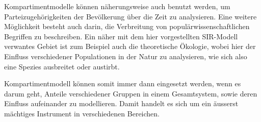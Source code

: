 \begin{refsection}
Kompartimentmodelle können näherungsweise auch benutzt werden, um Parteizugehörigkeiten der Bevölkerung über die Zeit zu analysieren. 
Eine weitere Möglichkeit besteht auch darin, die Verbreitung von populärwissenschaftlichen Begriffen zu beschreiben. 
Ein näher mit dem hier vorgestellten SIR-Modell verwantes Gebiet ist zum Beispiel auch die theoretische Ökologie, wobei hier der Einfluss verschiedener Populationen in der Natur zu analysieren, wie sich also eine Spezies ausbreitet oder austirbt.

Kompartimentmodell können somit immer dann eingesetzt werden, wenn es darum geht, Anteile verschiedener Gruppen in einem Gesamtsystem, sowie deren Einfluss aufeinander zu modellieren. 
Damit handelt es sich um ein äusserst mächtiges Instrument in verschiedenen Bereichen. 


\printbibliography[heading=subbibliography]
\end{refsection}


